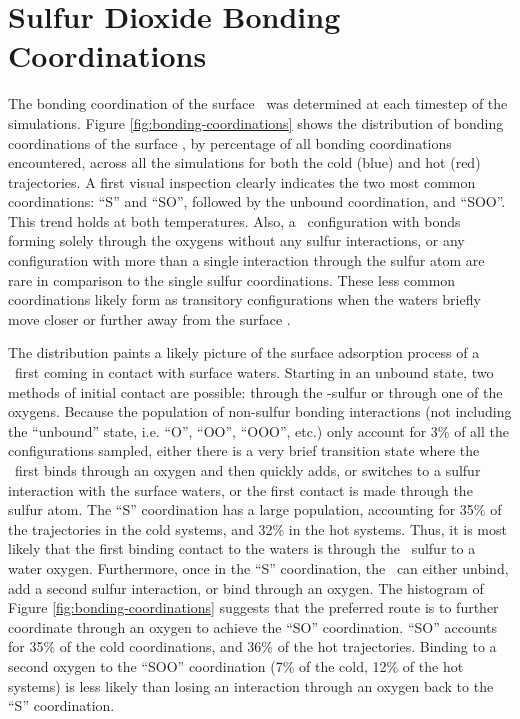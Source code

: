 \section {Sulfur Dioxide Bonding Coordinations}

The bonding coordination of the surface \suldiox~was determined at each timestep of the simulations. Figure \ref{fig:bonding-coordinations} shows the distribution of bonding coordinations of the surface \suldiox, by percentage of all bonding coordinations encountered, across all the simulations for both the cold (blue) and hot (red) trajectories. A first visual inspection clearly indicates the two most common coordinations: ``S'' and ``SO'', followed by the unbound coordination, and ``SOO''. This trend holds at both temperatures. Also, a \suldiox~configuration with bonds forming solely through the oxygens without any sulfur interactions, or any configuration with more than a single interaction through the sulfur atom are rare in comparison to the single sulfur coordinations. These less common coordinations likely form as transitory configurations when the waters briefly move closer or further away from the surface \suldiox.

The distribution paints a likely picture of the surface adsorption process of a \suldiox~first coming in contact with surface waters. Starting in an unbound state, two methods of initial contact are possible: through the \suldiox-sulfur or through one of the oxygens. Because the population of non-sulfur bonding interactions (not including the ``unbound'' state, i.e. ``O'', ``OO'', ``OOO'', etc.) only account for 3\% of all the configurations sampled, either there is a very brief transition state where the \suldiox~first binds through an oxygen and then quickly adds, or switches to a sulfur interaction with the surface waters, or the first contact is made through the sulfur atom. The ``S'' coordination has a large population, accounting for 35\% of the trajectories in the cold systems, and 32\% in the hot systems. Thus, it is most likely that the first binding contact to the waters is through the \suldiox~sulfur to a water oxygen. Furthermore, once in the ``S'' coordination, the \suldiox~can either unbind, add a second sulfur interaction, or bind through an oxygen. The histogram of Figure \ref{fig:bonding-coordinations} suggests that the preferred route is to further coordinate through an oxygen to achieve the ``SO'' coordination. ``SO'' accounts for 35\% of the cold coordinations, and 36\% of the hot trajectories. Binding to a second oxygen to the ``SOO'' coordination (7\% of the cold, 12\% of the hot systems) is less likely than losing an interaction through an oxygen back to the ``S'' coordination.

